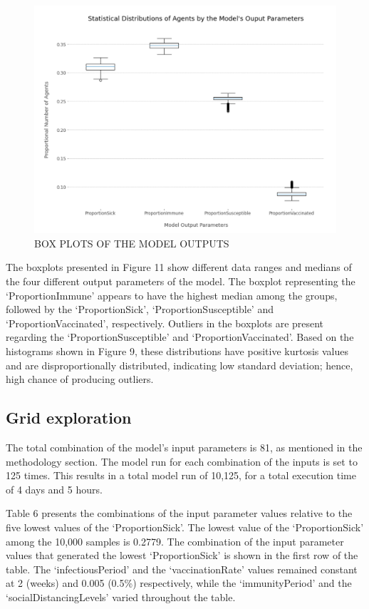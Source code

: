 \documentclass[smallextended]{svjour3}       %
\begin{document}
\begin{figure}
	\centering
	\includegraphics[width=0.7\linewidth]{figures/agentTypeDistrib.png}
	\caption{BOX PLOTS OF THE MODEL OUTPUTS\label{fig:agenttypedistrib}}
\end{figure}


The boxplots presented in Figure 11 show different data ranges and medians of the four different output parameters of the model. The boxplot representing the ‘ProportionImmune’ appears to have the highest median among the groups, followed by the ‘ProportionSick’, ‘ProportionSusceptible’ and ‘ProportionVaccinated’, respectively. Outliers in the boxplots are present regarding the ‘ProportionSusceptible’ and ‘ProportionVaccinated’. Based on the histograms shown in Figure 9, these distributions have positive kurtosis values and are disproportionally distributed, indicating low standard deviation; hence, high chance of producing outliers.


\subsection{Grid exploration}

The total combination of the model's input parameters is 81, as mentioned in the methodology section. The model run for each combination of the inputs is set to 125 times. This results in a total model run of 10,125, for a total execution time of 4 days and 5 hours.

Table 6 presents the combinations of the input parameter values relative to the five lowest values of the ‘ProportionSick’. The lowest value of the ‘ProportionSick’ among the 10,000 samples is 0.2779. The combination of the input parameter values that generated the lowest ‘ProportionSick’ is shown in the first row of the table. The ‘infectiousPeriod’ and the ‘vaccinationRate’ values remained constant at 2 (weeks) and 0.005 (0.5\%) respectively, while the ‘immunityPeriod’ and the ‘socialDistancingLevels’ varied throughout the table.
\end{document}
